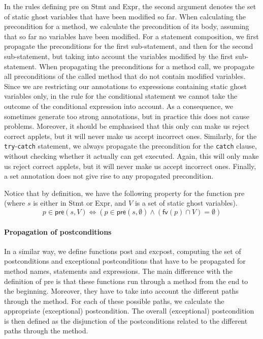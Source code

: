 In the rules defining \textsf{pre} on \textsf{Stmt} and \textsf{Expr},
the second argument denotes the set of static ghost variables that have been
modified so far. When calculating the precondition for a method, we
calculate the precondition of its body, assuming that so far no variables
have been modified. For a statement composition, we first
propagate the preconditions for the first sub-statement, and then for
the second sub-statement, but taking into account the variables
modified by the first sub-statement. When propagating the preconditions
for a method call, we propagate all preconditions of the called method
that do not contain modified variables.  Since we are restricting our
annotations to expressions containing static ghost variables only, in
the rule for the conditional statement we cannot take the outcome of
the conditional expression into account. As a consequence, we
sometimes generate too strong annotations, but in practice this does
not cause problems. Moreover, it should be emphasised that this
only can make us reject correct applets, but it will never make us
accept incorrect ones.  Similarly, for the
\texttt{try}-\texttt{catch} statement, we always propagate the
precondition for the \texttt{catch} clause, without checking whether it
actually can get executed. Again, this will only make us reject
correct applets, but it will never make us accept incorrect
ones. Finally, a set annotation does not give rise to any propagated
precondition. 

Notice that by definition, we have the following property for the
function \textsf{pre} (where \(s\) is either in \textsf{Stmt} or
\textsf{Expr}, and \(V\) is a set of static ghost variables).
\[
p \in \textsf{pre}(s, V) \Leftrightarrow (p \in \textsf{pre}(s,
\emptyset) \wedge (\textsf{fv}(p) \cap V) = \emptyset)
\]

\paragraph{Propagation of postconditions}
In a similar way, we define functions \textsf{post} and
\textsf{exc\-post},  computing the
set of postconditions and exceptional postconditions that have to be
propagated for method names, statements and expressions. The main
difference with the definition of \textsf{pre} is that these functions run
through a method from the end to the beginning. Moreover, they have to
take into account the different paths through the method. For
each of these possible paths, we calculate the appropriate
(exceptional) postcondition. The overall (exceptional) postcondition
is then defined as the disjunction of the postconditions related to
the different paths through the method. 

